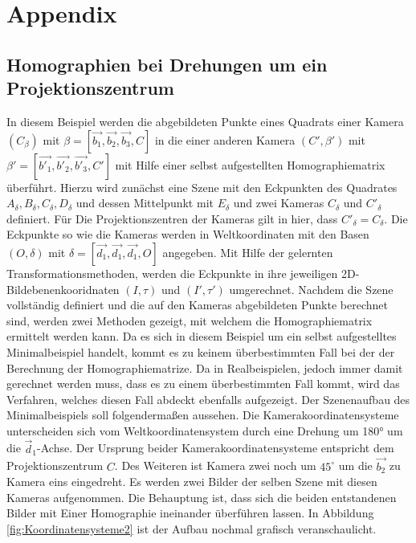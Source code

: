 \chapter{Appendix}
\label{sec:appendix}

\section{Homographien bei Drehungen um ein Projektionszentrum}
\label{sec:AppendixHomographieRotationPZ}

In diesem Beispiel werden die abgebildeten Punkte eines Quadrats einer Kamera $(C_\beta)$ mit $\beta= [\vec{b_1},\vec{b_2},\vec{b_3},C]$ in die einer anderen Kamera $(C',\beta')$ mit $\beta'= [\vec{b'_1},\vec{b'_2},\vec{b'_3},C']$  mit Hilfe einer selbst aufgestellten Homographiematrix überführt. Hierzu wird zunächst eine Szene mit den Eckpunkten des Quadrates $A_\delta, B_\delta, C_\delta, D_\delta$ und dessen Mittelpunkt mit $E_\delta$ und zwei Kameras $C_{\delta}$ und $C'_{\delta}$ definiert. Für Die Projektionszentren der Kameras gilt in hier, dass $C'_{\delta} = C_\delta$. Die Eckpunkte so wie die Kameras werden in Weltkoordinaten mit den Basen $(O,\delta)$ mit $\delta = [\vec{d_1},\vec{d_1},\vec{d_1},O]$ angegeben. Mit Hilfe der gelernten Transformationsmethoden, werden die Eckpunkte in ihre jeweiligen 2D-Bildebenenkooridnaten $(I,\tau)$ und $(I',\tau')$ umgerechnet. Nachdem die Szene vollständig definiert und die auf den Kameras abgebildeten Punkte berechnet sind, werden zwei Methoden gezeigt, mit welchem die Homographiematrix ermittelt werden kann. Da es sich in diesem Beispiel um ein selbst aufgestelltes Minimalbeispiel handelt, kommt es zu keinem überbestimmten Fall bei der der Berechnung der Homographiematrize. Da in Realbeispielen, jedoch immer damit gerechnet werden muss, dass es zu einem überbestimmten Fall kommt, wird das Verfahren, welches diesen Fall abdeckt ebenfalls aufgezeigt. Der Szenenaufbau des Minimalbeispiels soll folgendermaßen aussehen. Die Kamerakoordinatensysteme unterscheiden sich vom Weltkoordinatensystem durch eine Drehung um 180° um die \ensuremath{\vec{d}_1}-Achse. Der Ursprung beider Kamerakoordinatensysteme entspricht dem Projektionszentrum $C$. Des Weiteren ist Kamera zwei noch um $45^\circ$ um die $\vec{b_2}$ zu Kamera eins eingedreht. Es werden zwei Bilder der selben Szene mit diesen Kameras aufgenommen. Die Behauptung ist, dass sich die beiden entstandenen Bilder mit Einer Homographie ineinander überführen lassen. In Abbildung \ref{fig:Koordinatensysteme2} ist der Aufbau nochmal grafisch veranschaulicht.

